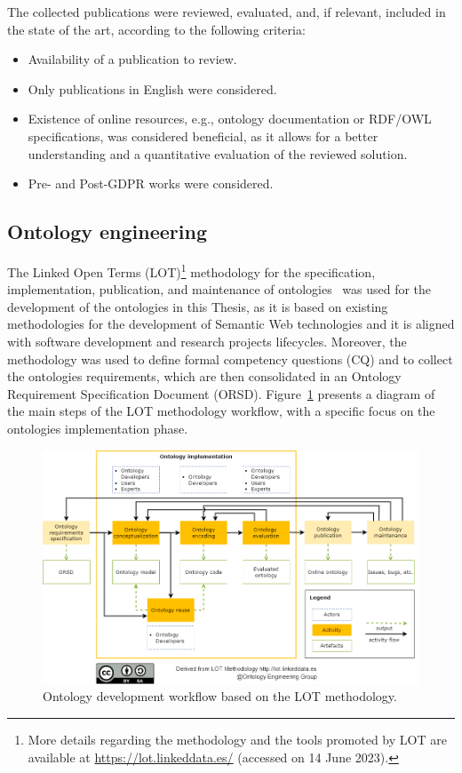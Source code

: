 The collected publications were reviewed, evaluated, and, if relevant, included in the state of the art, according to the following criteria:

\begin{itemize}
\item Availability of a publication to review.
\item Only publications in English were considered.
\item Existence of online resources, e.g., ontology documentation or RDF/OWL specifications, was considered beneficial, as it allows for a better understanding and a quantitative evaluation of the reviewed solution.
\item Pre- and Post-GDPR works were considered.
\end{itemize}

\subsection{Ontology engineering}
\label{sec:ontology_engineering}

The Linked Open Terms (LOT)\footnote{More details regarding the methodology and the tools promoted by LOT are available at \url{https://lot.linkeddata.es/} (accessed on 14 June 2023).} methodology for the specification, implementation, publication, and maintenance of ontologies~\citep{poveda-villalon_lot_2022} was used for the development of the ontologies in this Thesis, as it is based on existing methodologies for the development of Semantic Web technologies and it is aligned with software development and research projects lifecycles.
Moreover, the~\cite{suarez-figueroa_neon_2012} methodology was used to define formal competency questions (CQ) and to collect the ontologies requirements, which are then consolidated in an Ontology Requirement Specification Document (ORSD).
Figure~\ref{fig:lot} presents a diagram of the main steps of the LOT methodology workflow, with a specific focus on the ontologies implementation phase.

\begin{figure}
    \centering
    \includegraphics[width=\linewidth]{figures/chapter-3/LOT.png}
    \caption{Ontology development workflow based on the LOT methodology.}
    \label{fig:lot}
\end{figure}

